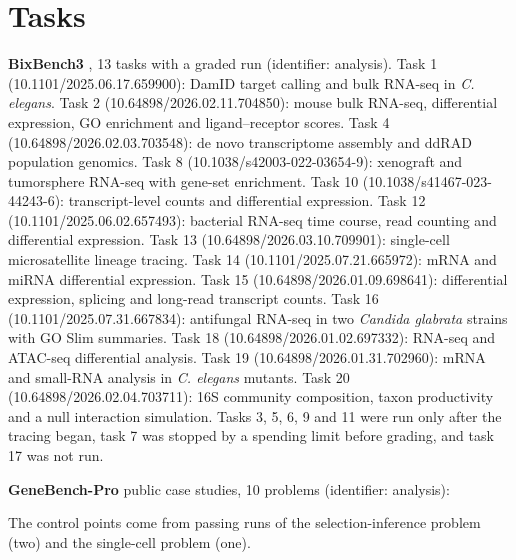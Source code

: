 \documentclass[10pt]{article}
\begin{document}
\section{Tasks}\label{app:tasks}
\textbf{BixBench3} \citep{koch2026bixbench3}, 13 tasks with a graded run (identifier: analysis). Task 1 (10.1101/2025.06.17.659900): DamID target calling
and bulk RNA-seq in \emph{C. elegans}. Task 2 (10.64898/2026.02.11.704850): mouse bulk RNA-seq, differential expression, GO enrichment and
ligand--receptor scores. Task 4 (10.64898/2026.02.03.703548): de novo transcriptome assembly and ddRAD population genomics. Task 8
(10.1038/s42003-022-03654-9): xenograft and tumorsphere RNA-seq with gene-set enrichment. Task 10 (10.1038/s41467-023-44243-6): transcript-level
counts and differential expression. Task 12 (10.1101/2025.06.02.657493): bacterial RNA-seq time course, read counting and differential expression.
Task 13 (10.64898/2026.03.10.709901): single-cell microsatellite lineage tracing. Task 14 (10.1101/2025.07.21.665972): mRNA and miRNA differential
expression. Task 15 (10.64898/2026.01.09.698641): differential expression, splicing and long-read transcript counts. Task 16
(10.1101/2025.07.31.667834): antifungal RNA-seq in two \emph{Candida glabrata} strains with GO Slim summaries. Task 18 (10.64898/2026.01.02.697332):
RNA-seq and ATAC-seq differential analysis. Task 19 (10.64898/2026.01.31.702960): mRNA and small-RNA analysis in \emph{C. elegans} mutants. Task 20
(10.64898/2026.02.04.703711): 16S community composition, taxon productivity and a null interaction simulation. Tasks 3, 5, 6, 9 and 11 were run only
after the tracing began, task 7 was stopped by a spending limit before grading, and task 17 was not run.

\textbf{GeneBench-Pro} \citep{openai2026genebench} public case studies, 10 problems (identifier: analysis):

The control points come from passing runs of the selection-inference problem (two) and the single-cell problem (one).
\end{document}
